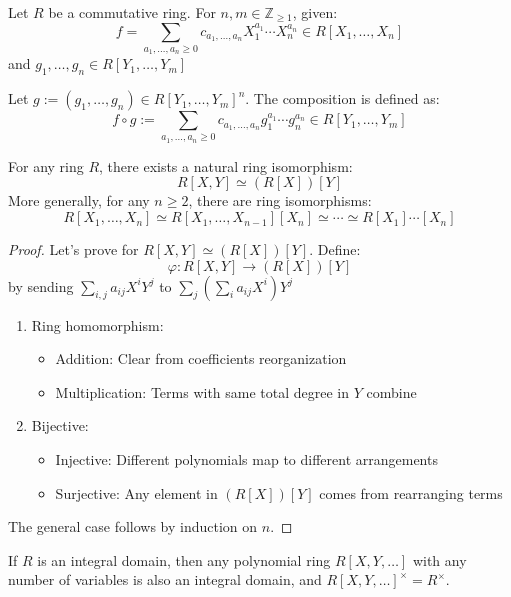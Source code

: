 \begin{definition}
  Let $R$ be a commutative ring. For $n,m \in \mathbb{Z}_{\geq 1}$, given:
  \[
    f = \sum_{a_1,\ldots,a_n \geq 0} c_{a_1,\ldots,a_n} X_1^{a_1}\cdots X_n^{a_n} \in R[X_1,\ldots,X_n]
  \]
  and $g_1,\ldots,g_n \in R[Y_1,\ldots,Y_m]$

  Let $g := (g_1,\ldots,g_n) \in R[Y_1,\ldots,Y_m]^n$. The composition is defined as:
  \[
    f \circ g := \sum_{a_1,\ldots,a_n \geq 0} c_{a_1,\ldots,a_n} g_1^{a_1}\cdots g_n^{a_n} \in R[Y_1,\ldots,Y_m]
  \]
\end{definition}

\begin{proposition}
  For any ring $R$, there exists a natural ring isomorphism:
  \[
    R[X,Y] \simeq (R[X])[Y]
  \]
  More generally, for any $n \geq 2$, there are ring isomorphisms:
  \[
    R[X_1,\ldots,X_n] \simeq R[X_1,\ldots,X_{n-1}][X_n] \simeq \cdots \simeq R[X_1]\cdots[X_n]
  \]
\end{proposition}

\begin{proof}
  Let's prove for $R[X,Y] \simeq (R[X])[Y]$. Define:
  \[
    \varphi: R[X,Y] \to (R[X])[Y]
  \]
  by sending $\sum_{i,j} a_{ij}X^iY^j$ to $\sum_j (\sum_i a_{ij}X^i)Y^j$

  \begin{enumerate}
    \item Ring homomorphism:
      \begin{itemize}
        \item Addition: Clear from coefficients reorganization
        \item Multiplication: Terms with same total degree in $Y$ combine
      \end{itemize}

    \item Bijective:
      \begin{itemize}
        \item Injective: Different polynomials map to different arrangements
        \item Surjective: Any element in $(R[X])[Y]$ comes from rearranging terms
      \end{itemize}
  \end{enumerate}

  The general case follows by induction on $n$.
\end{proof}

\begin{corollary}
  If $R$ is an integral domain, then any polynomial ring $R[X,Y,\ldots]$ with any number of variables is also an integral domain, and $R[X,Y,\ldots]^\times = R^\times$.
\end{corollary}

